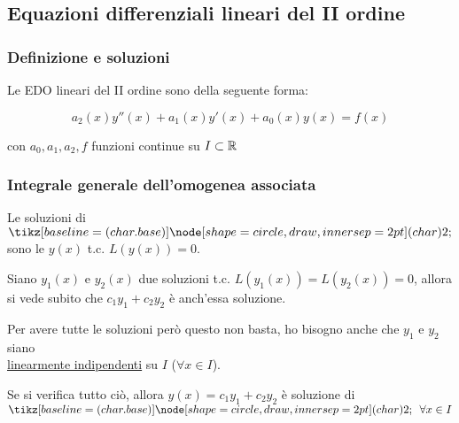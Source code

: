 
\subsection{Equazioni differenziali lineari del II ordine}

\subsubsection{Definizione e soluzioni}

Le EDO lineari del II ordine sono della seguente forma:

\[
    a_2(x)y''(x) + a_1(x) y'(x) + a_0(x) y(x) = f(x)
\]

con \(a_0,a_1,a_2,f\) funzioni continue su \(I \subset \mathbb{R} \)




\subsubsection*{Integrale generale dell'omogenea associata}

Le soluzioni di \(\circled{2}\) sono le \(y(x)\) t.c. \(L(y(x)) = 0\).

Siano \(y_1(x)\) e \(y_2(x)\) due soluzioni t.c. \(L(y_1(x)) = L(y_2(x)) = 0\),
allora si vede subito che \(c_1y_1 + c_2y_2\) è anch'essa soluzione.

Per avere tutte le soluzioni però questo non basta, ho bisogno anche che \(y_1\) e \(y_2\) siano \\
\underline{linearmente indipendenti} su \(I\) (\(\forall x \in I\)).

Se si verifica tutto ciò, allora \(y(x) = c_1y_1 + c_2y_2\) è soluzione di \(\circled{2}\ \ \forall x \in I\)


